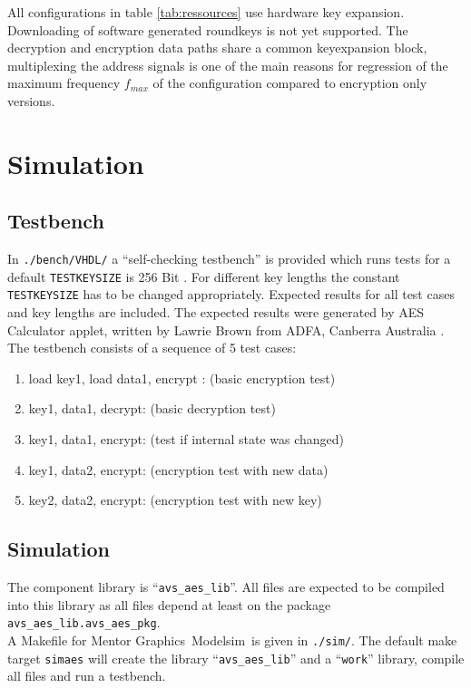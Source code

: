 \documentclass{ruschidoc}
\begin{document}
All configurations in table \ref{tab:ressources} use hardware key
expansion. Downloading of software generated roundkeys is not yet supported. The
decryption and encryption data paths share a common keyexpansion block, multiplexing
the address signals is one of the main reasons for regression of the maximum
frequency $f_{max}$ of the configuration compared to encryption only versions. 

\section{Simulation}
\label{sec:simulation}
\subsection{Testbench}
\label{sec:testbench}
In \texttt{./bench/VHDL/} a ``self-checking testbench'' is provided which runs tests
for a default \texttt{TESTKEYSIZE} is 256 Bit . For different key lengths the
constant \texttt{TESTKEYSIZE} has to be changed appropriately. Expected results for
all test cases and key lengths are included. The expected results were generated by
AES Calculator applet, written by Lawrie Brown from ADFA, Canberra Australia \cite{LaBr05}.  The
testbench consists of a sequence of 5 test cases:
\begin{enumerate}
\item load key1, load data1, encrypt : (basic encryption test)
\item key1, data1, decrypt: (basic decryption test)
\item key1, data1, encrypt: (test if internal state was changed) 
\item key1, data2, encrypt: (encryption test with new data)
\item key2, data2, encrypt: (encryption test with new key) 
\end{enumerate}

\subsection{Simulation}
\label{sec:simulation}
The component library is ``\texttt{avs\_aes\_lib}''. All files are expected to be
compiled into this library as all files depend at least on the package
\texttt{avs\_aes\_lib.avs\_aes\_pkg}. \\
A Makefile for Mentor Graphics\rtm\ Modelsim\rtm\ is given in \texttt{./sim/}. The
default make target \texttt{simaes} will create the library
``\texttt{avs\_aes\_lib}'' and a ``\texttt{work}'' library, compile all files and run
a testbench. \\
\end{document}
